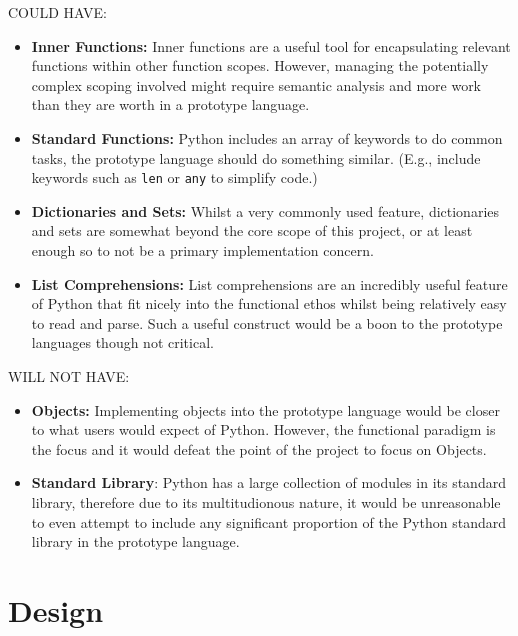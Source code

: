 \documentclass{l4proj}
\begin{document}
COULD HAVE:
\begin{itemize}
    \item \textbf{Inner Functions:} Inner functions are a useful tool for encapsulating relevant functions within other function scopes.
    However, managing the potentially complex scoping involved might require semantic analysis and more work than they are worth in a prototype language.
    \item \textbf{Standard Functions:} Python includes an array of keywords to do common tasks, the prototype language should do something similar.
    (E.g., include keywords such as \verb|len| or \verb|any| to simplify code.)
    \item \textbf{Dictionaries and Sets:} Whilst a very commonly used feature, dictionaries and sets are somewhat beyond the core scope of this project, or at least enough so to not be a primary implementation concern.
    \item \textbf{List Comprehensions:} List comprehensions are an incredibly useful feature of Python that fit nicely into the functional ethos whilst being relatively easy to read and parse.
    Such a useful construct would be a boon to the prototype languages though not critical.
\end{itemize}

WILL NOT HAVE:
\begin{itemize}
    \item \textbf{Objects:} Implementing objects into the prototype language would be closer to what users would expect of Python. However, the functional paradigm is the focus and it would defeat the point of the project to focus on Objects.
    \item \textbf{Standard Library}: Python has a large collection of modules in its standard library, therefore due to its multitudionous nature, it would be unreasonable to even attempt to include any significant proportion of the Python standard library in the prototype language. 
\end{itemize}


\chapter{Design}
\end{document}
